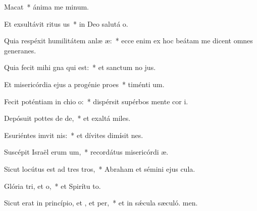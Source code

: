 \item Macat~* ánima me minum.
\item Et exsultávit ritus us~* in Deo salutá o.
\item Quia respéxit humilitátem anlæ æ:~* ecce enim ex hoc beátam me dicent omnes generanes.
\item Quia fecit mihi gna qui  est:~* et sanctum no jus.
\item Et misericórdia ejus a progénie  proes~* timénti um.
\item Fecit poténtiam in chio o:~* dispérsit supérbos mente cor i.
\item Depósuit pottes de de,~* et exaltá miles.
\item Esuriéntes imvit nis:~* et dívites dimísit nes.
\item Suscépit Israël erum um,~* recordátus misericórdi æ.
\item Sicut locútus est ad tres tros,~* Abraham et sémini ejus  cula.
\item Glória tri, et o,~* et Spirítu to.
\item Sicut erat in princípio, et , et per,~* et in sǽcula sæculó. men.
